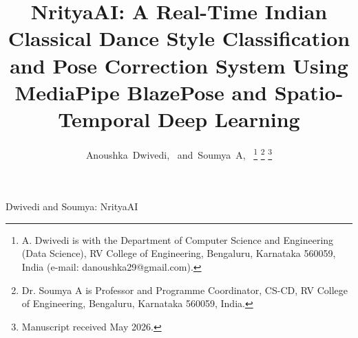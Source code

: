 \documentclass[journal]{IEEEtran}
\begin{document}
\title{NrityaAI: A Real-Time Indian Classical Dance Style Classification
and Pose Correction System Using MediaPipe BlazePose and
Spatio-Temporal Deep Learning}

\author{Anoushka~Dwivedi,~\IEEEmembership{}
        and~Soumya~A,~\IEEEmembership{}%
\thanks{A. Dwivedi is with the Department of Computer Science and
Engineering (Data Science), RV College of Engineering, Bengaluru,
Karnataka 560059, India (e-mail: danoushka29@gmail.com).}%
\thanks{Dr. Soumya A is Professor and Programme Coordinator, CS-CD,
RV College of Engineering, Bengaluru, Karnataka 560059, India.}%
\thanks{Manuscript received May 2026.}}

%
{Dwivedi and Soumya: NrityaAI}

\maketitle
\end{document}
